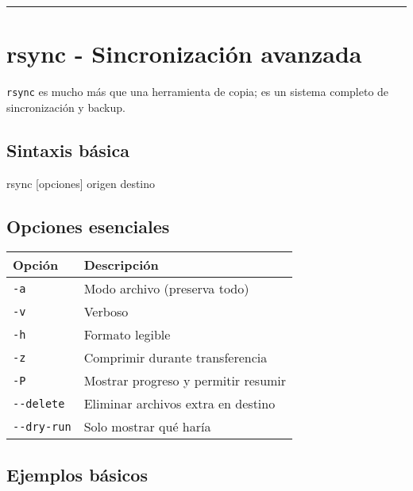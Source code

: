 \documentclass[
  11pt,
  letterpaper,
  oneside,
  openany]{scrbook}
\newenvironment{Shaded}{}{}
\newcommand{\FunctionTok}[1]{\textcolor[rgb]{0.44,0.26,0.76}{#1}}
\newcommand{\NormalTok}[1]{\textcolor[rgb]{0.14,0.16,0.18}{#1}}
\newcommand{\PreprocessorTok}[1]{\textcolor[rgb]{0.84,0.23,0.29}{#1}}
\newcommand{\SpecialStringTok}[1]{\textcolor[rgb]{0.01,0.18,0.38}{#1}}
\begin{document}
\begin{center}\rule{0.5\linewidth}{0.5pt}\end{center}

\section{rsync - Sincronización avanzada}\label{sec-rsync}

\texttt{rsync} es mucho más que una herramienta de copia; es un sistema
completo de sincronización y backup.

\subsection{Sintaxis básica}\label{sintaxis-buxe1sica}

\begin{Shaded}
\begin{Highlighting}[]
\FunctionTok{rsync} \PreprocessorTok{[}\SpecialStringTok{opciones}\PreprocessorTok{]}\NormalTok{ origen destino}
\end{Highlighting}
\end{Shaded}

\subsection{Opciones esenciales}\label{opciones-esenciales}

\begin{longtable}[]{@{}ll@{}}
\toprule\noalign{}
Opción & Descripción \\
\midrule\noalign{}
\endhead
\bottomrule\noalign{}
\endlastfoot
\texttt{-a} & Modo archivo (preserva todo) \\
\texttt{-v} & Verboso \\
\texttt{-h} & Formato legible \\
\texttt{-z} & Comprimir durante transferencia \\
\texttt{-P} & Mostrar progreso y permitir resumir \\
\texttt{-\/-delete} & Eliminar archivos extra en destino \\
\texttt{-\/-dry-run} & Solo mostrar qué haría \\
\end{longtable}

\subsection{Ejemplos básicos}\label{ejemplos-buxe1sicos-1}
\end{document}
